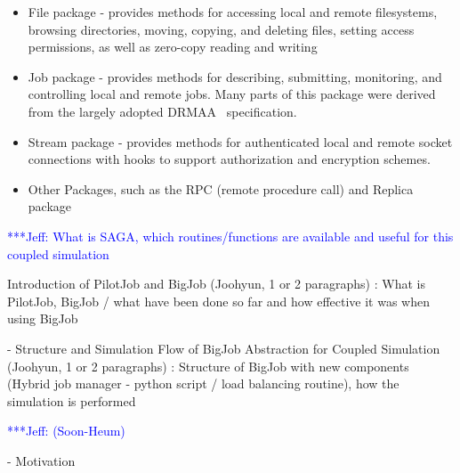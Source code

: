 \documentclass[times, 10pt,twocolumn]{article}
\newcommand{\skonote}[1]{ {\textcolor{blue} { ***Jeff: #1 }}}
\newcommand{\skonote}[1]{}
\begin{document}
\begin{itemize}
\item File package - provides methods for accessing local and remote
  filesystems, browsing directories, moving, copying, and deleting
  files, setting access permissions, as well as zero-copy reading and
  writing
\item Job package - provides methods for describing, submitting,
  monitoring, and controlling local and remote jobs. Many parts of
  this package were derived from the largely adopted
  DRMAA~\cite{drmaa_url} specification.
\item Stream package - provides methods for authenticated local and
  remote socket connections with hooks to support authorization and
  encryption schemes.
\item Other Packages, such as the RPC (remote procedure call) and Replica
  package
\end{itemize}


\skonote{What is SAGA, which routines/functions are available and useful for this coupled simulation}

Introduction of PilotJob and BigJob (Joohyun, 1 or 2 paragraphs) : What is PilotJob, BigJob / what have been done so far and how effective it was when using BigJob

- Structure and Simulation Flow of BigJob Abstraction for Coupled Simulation (Joohyun, 1 or 2 paragraphs) : Structure of BigJob with new components (Hybrid job manager - python script / load balancing routine), how the simulation is performed


\skonote{(Soon-Heum)}

- Motivation
\end{document}
